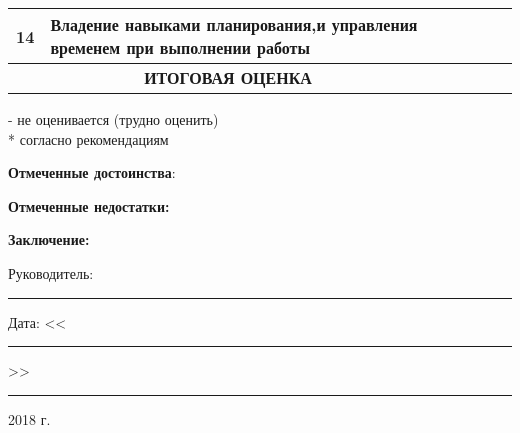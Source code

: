 \begin{table}[h]
{\begin{tabular}{|c|l|l|l|l|l|}
		14                 & Владение навыками планирования,и управления временем при выполнении работы                                                                                                                 &       &       &      &      \\ \hline
		\multicolumn{2}{|c|}{\textbf{ИТОГОВАЯ ОЦЕНКА}}                                                                                                                                                                                     & \multicolumn{4}{l|}{}       \\ \hline
	\end{tabular}}

{\tiny * - не оценивается (трудно оценить)}\\
{\tiny ** согласно рекомендациям}
\end{table}

\newpage
\thispagestyle{empty}

\textbf{Отмеченные достоинства}: \hrulefill

\hrulefill

\hrulefill

\hrulefill

\hrulefill

\hrulefill

\hrulefill

\hrulefill

\hrulefill

\hrulefill

\hrulefill

\hrulefill

\hrulefill

\textbf{Отмеченные недостатки:} \hrulefill

\hrulefill

\hrulefill

\hrulefill

\hrulefill

\hrulefill

\hrulefill

\hrulefill

\hrulefill

\hrulefill

\hrulefill

\hrulefill

\textbf{Заключение:}  \hrulefill

\hrulefill

\hrulefill

\hrulefill

\hrulefill

\hrulefill

\hrulefill

Руководитель: \rule{10em}{.1pt}

Дата: <<\rule{2em}{.1pt}>> \rule{6em}{.1pt} 2018 г.